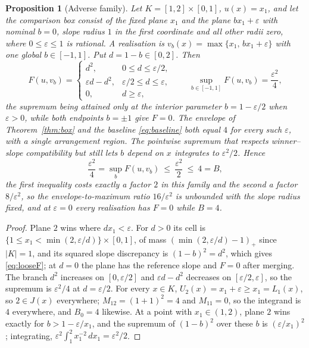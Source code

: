 \documentclass[11pt]{article}
\newtheorem{proposition}[theorem]{Proposition}
\theoremstyle{remark}
\begin{document}
\begin{proposition}[Adverse family]\label{prop:loose}
Let $K=[1,2]\times[0,1]$, $u(x)=x_1$, and let the comparison box consist of
the fixed plane $x_1$ and the plane $bx_1+\varepsilon$ with nominal $b=0$,
slope radius $1$ in the first coordinate and all other radii zero, where
$0\le\varepsilon\le1$ is rational. A realisation is
$v_b(x)=\max\{x_1,\,bx_1+\varepsilon\}$ with one global $b\in[-1,1]$. Put
$d=1-b\in[0,2]$. Then
\begin{equation}\label{eq:looseF}
 F(u,v_b)=\begin{cases}d^2,&0\le d\le\varepsilon/2,\\
 \varepsilon d-d^2,&\varepsilon/2\le d\le\varepsilon,\\
 0,&d\ge\varepsilon,\end{cases}
 \qquad
 \sup_{b\in[-1,1]}F(u,v_b)=\frac{\varepsilon^2}{4},
\end{equation}
the supremum being attained only at the interior parameter $b=1-\varepsilon/2$
when $\varepsilon>0$, while both endpoints $b=\pm1$ give $F=0$. The envelope
of Theorem~\ref{thm:box} and the baseline \eqref{eq:baseline} both equal $4$
for every such $\varepsilon$, with a single arrangement region. The pointwise
supremum that respects winner--slope compatibility but still lets $b$ depend
on $x$ integrates to $\varepsilon^2/2$. Hence
\[
 \frac{\varepsilon^2}{4}=\sup_b F(u,v_b)\ \le\ \frac{\varepsilon^2}{2}\ \le\ 4=B,
\]
the first inequality costs exactly a factor $2$ in this family and the second a
factor $8/\varepsilon^2$, so the envelope-to-maximum ratio $16/\varepsilon^2$ is
unbounded with the slope radius fixed, and at $\varepsilon=0$ every realisation
has $F=0$ while $B=4$.
\end{proposition}
\begin{proof}
Plane $2$ wins where $dx_1<\varepsilon$. For $d>0$ its cell is
$\{1\le x_1<\min(2,\varepsilon/d)\}\times[0,1]$, of mass
$(\min(2,\varepsilon/d)-1)_+$ since $|K|=1$, and its squared slope
discrepancy is $(1-b)^2=d^2$, which gives \eqref{eq:looseF}; at $d=0$ the
plane has the reference slope and $F=0$ after merging. The branch $d^2$
increases on $[0,\varepsilon/2]$ and $\varepsilon d-d^2$ decreases on
$[\varepsilon/2,\varepsilon]$, so the supremum is $\varepsilon^2/4$ at
$d=\varepsilon/2$. For every $x\in K$, $U_2(x)=x_1+\varepsilon\ge x_1=L_1(x)$,
so $2\in J(x)$ everywhere; $M_{12}=(1+1)^2=4$ and $M_{11}=0$, so the integrand
is $4$ everywhere, and $B_0=4$ likewise. At a point with $x_1\in(1,2)$, plane
$2$ wins exactly for $b>1-\varepsilon/x_1$, and the supremum of $(1-b)^2$ over
these $b$ is $(\varepsilon/x_1)^2$; integrating,
$\varepsilon^2\int_1^2x_1^{-2}\,dx_1=\varepsilon^2/2$.
\end{proof}
\end{document}
